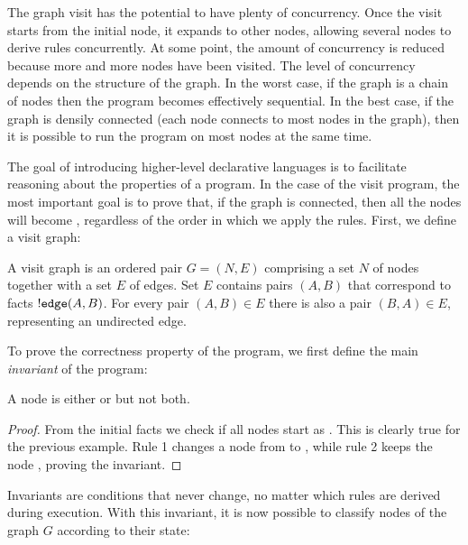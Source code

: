 The graph visit has the potential to have plenty of concurrency. Once the visit
starts from the initial node, it expands to other nodes, allowing several nodes
to derive rules concurrently. At some point, the amount of concurrency is
reduced because more and more nodes have been visited. The level of concurrency
depends on the structure of the graph. In the worst case, if the graph is a
chain of nodes then the program becomes effectively sequential.  In the best
case, if the graph is densily connected (each node connects to most nodes in the
graph), then it is possible to run the program on most nodes at the same time.

The goal of introducing higher-level declarative languages is to facilitate
reasoning about the properties of a program. In the case of the visit program,
the most important goal is to prove that, if the graph is connected, then all
the nodes will become , regardless of the order in which we apply
the rules. First, we define a visit graph:

\begin{definition}
A visit graph is an ordered pair $G = (N, E)$ comprising a set $N$ of nodes together
with a set $E$ of edges. Set $E$ contains pairs $(A, B)$ that correspond to
facts ${!} \mathtt{edge}(A, B)$. For every pair $(A, B) \in E$ there is also a
pair $(B, A) \in E$, representing an undirected edge.
\end{definition}

To prove the correctness property of the program, we first define the main
\emph{invariant} of the program:

\begin{invariant}
A node is either  or  but not both.
\end{invariant}

\begin{proof}

From the initial facts we check if all nodes start as . This is
clearly true for the previous example. Rule 1 changes a node from
 to , while rule 2 keeps the node ,
proving the invariant.

\end{proof}

Invariants are conditions that never change, no matter which rules are derived
during execution. With this invariant, it is now possible to classify nodes of
the graph $G$ according to their state:

